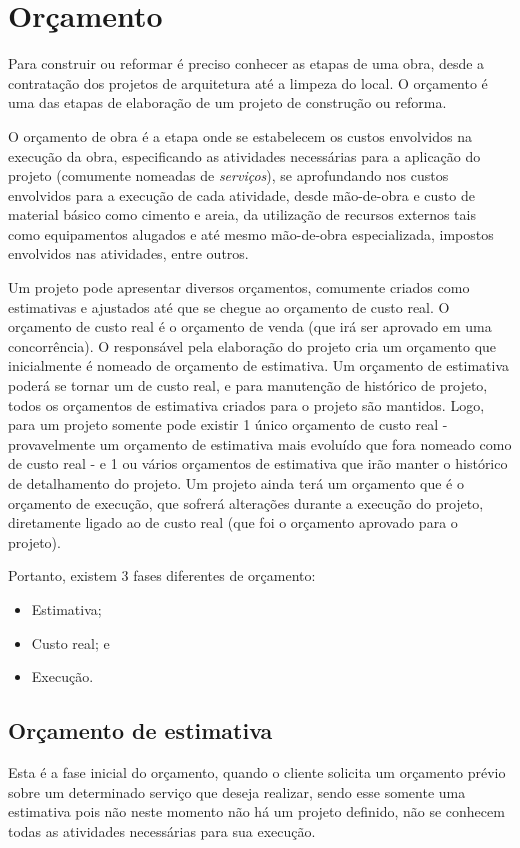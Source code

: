 \chapter{Orçamento}
Para construir ou reformar é preciso conhecer as etapas de uma obra, desde a contratação dos projetos de arquitetura até a limpeza do local. O orçamento é uma das etapas de elaboração de um projeto de construção ou reforma.

O orçamento de obra é a etapa onde se estabelecem os custos envolvidos na execução da obra, especificando as atividades necessárias para a aplicação do projeto (comumente nomeadas de \emph{serviços}), se aprofundando nos custos envolvidos para a execução de cada atividade, desde mão-de-obra e custo de material básico como cimento e areia, da utilização de recursos externos tais como equipamentos alugados e até mesmo mão-de-obra especializada, impostos envolvidos nas atividades, entre outros.

Um projeto pode apresentar diversos orçamentos, comumente criados como estimativas e ajustados até que se chegue ao orçamento de custo real. O orçamento de custo real é o orçamento de venda (que irá ser aprovado em uma concorrência).
O responsável pela elaboração do projeto cria um orçamento que inicialmente é nomeado de orçamento de estimativa. Um orçamento de estimativa poderá se tornar um de custo real, e para manutenção de histórico de projeto, todos os orçamentos de estimativa criados para o projeto são mantidos. 
Logo, para um projeto somente pode existir 1 único orçamento de custo real - provavelmente um orçamento de estimativa mais evoluído que fora nomeado como de custo real - e 1 ou vários orçamentos de estimativa que irão manter o histórico de detalhamento do projeto. Um projeto ainda terá um orçamento que é o orçamento de execução, que sofrerá alterações durante a execução do projeto, diretamente ligado ao de custo real (que foi o orçamento aprovado para o projeto).

Portanto, existem 3 fases diferentes de orçamento:

\begin{itemize}
	\item Estimativa;
	\item Custo real; e
	\item Execução.
\end{itemize}

\section{Orçamento de estimativa}
Esta é a fase inicial do orçamento, quando o cliente solicita um orçamento prévio sobre um determinado serviço que deseja realizar, sendo esse somente uma estimativa pois não neste momento não há um projeto definido, não se conhecem todas as atividades necessárias para sua execução.

